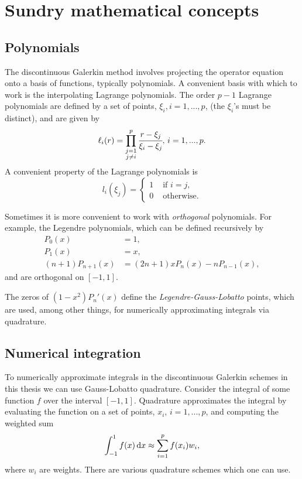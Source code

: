 \section{Sundry mathematical concepts}\label{eqn: la}
\subsection*{Polynomials}
The discontinuous Galerkin method involves projecting the operator equation onto a basis of functions, typically polynomials. A convenient basis with which to work is the interpolating Lagrange polynomials. The order \(p-1\) Lagrange polynomials are defined by a set of points, \(\xi_i, i=1,...,p\), (the \(\xi_i\)'s must be distinct), and are given by 
\[\ell_i(r)=\prod_{\substack{j=1\\j\neq i}}^p \cfrac{r-\xi_j}{\xi_i-\xi_j},\, i=1,...,p.\]
A convenient property of the Lagrange polynomials is 
\[l_i(\xi_j)=\begin{cases}1 & \mbox{ if } i=j, \\ 0 & \mbox{ otherwise.} \end{cases}\]

Sometimes it is more convenient to work with \emph{orthogonal} polynomials. For example, the Legendre polynomials, which can be defined recursively by 
\begin{align*}
	P_0(x)&=1,
	\\P_1(x)&=x, 
	\\(n+1)P_{n+1}(x)&=(2n+1)xP_n(x)-nP_{n-1}(x),
\end{align*}
and are orthogonal on \([-1,1]\). 

The zeros of \((1-x^2)P_n'(x)\) define the \emph{Legendre-Gauss-Lobatto} points, which are used, among other things, for numerically approximating integrals via quadrature.

\subsection*{Numerical integration}
To numerically approximate integrals in the discontinuous Galerkin schemes in this thesis we can use Gauss-Lobatto quadrature. Consider the integral of some function \(f\) over the interval \([-1,1]\). Quadrature approximates the integral by evaluating the function on a set of points, \(x_i,\, i=1,...,p\), and computing the weighted sum
\[\int_{-1}^1f(x)\, \mathrm{d} x \approx \sum_{i=1}^p f(x_i)w_i,\]
where \(w_i\) are weights. There are various quadrature schemes which one can use. 

